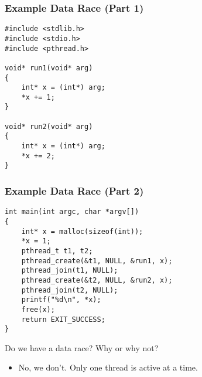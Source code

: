 \documentclass[aspectratio=43]{beamer}
\newenvironment{changemargin}[1]{%
  \begin{list}{}{%
    \setlength{\topsep}{0pt}%
    \setlength{\leftmargin}{#1}%
    \setlength{\rightmargin}{1em}
    \setlength{\listparindent}{\parindent}%
    \setlength{\itemindent}{\parindent}%
    \setlength{\parsep}{\parskip}%
  }%
  \item[]}{\end{list}}
\begin{document}
\begin{frame}[fragile]
  \frametitle{Example Data Race (Part 1)}

  \begin{changemargin}{2.5cm}
  \begin{lstlisting}
#include <stdlib.h>
#include <stdio.h>
#include <pthread.h>

void* run1(void* arg)
{
    int* x = (int*) arg;
    *x += 1;
}

void* run2(void* arg)
{
    int* x = (int*) arg;
    *x += 2;
}
  \end{lstlisting}
\end{changemargin}
\end{frame}

\begin{frame}[fragile]
  \frametitle{Example Data Race (Part 2)}

  \begin{changemargin}{2.5cm}
  \begin{lstlisting}
int main(int argc, char *argv[])
{
    int* x = malloc(sizeof(int));
    *x = 1;
    pthread_t t1, t2;
    pthread_create(&t1, NULL, &run1, x);
    pthread_join(t1, NULL);
    pthread_create(&t2, NULL, &run2, x);
    pthread_join(t2, NULL);
    printf("%d\n", *x);
    free(x);
    return EXIT_SUCCESS;
}
  \end{lstlisting}

     Do we have a data race? Why or why not?
  
  \begin{itemize}
    \item<2-> No, we don't. Only one thread is active at a time.
  \end{itemize}
   \end{changemargin}


\end{frame}
\end{document}
